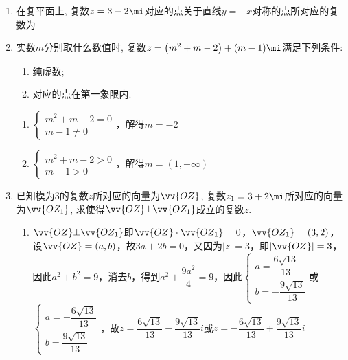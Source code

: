 \begin{enumerate}
    \item 在复平面上, 复数$z=3-2\mi$对应的点关于直线$y=-x$对称的点所对应的复数为
    \item 实数$m$分别取什么数值时, 复数$z=\left(m^2+m-2\right)+(m-1)\mi$满足下列条件: 
    \begin{enumerate}[(1)]
    \item 纯虚数; 
    \item 对应的点在第一象限内. 
    \end{enumerate}
    \begin{jieda}
        \begin{enumerate}
            \item $\left\{\begin{array}{l}
                 m^2+m-2 = 0 \\
                 m - 1 \neq 0
            \end{array}\right.$，解得$m = -2$
            \item $\left\{\begin{array}{l}
                 m^2+m-2 > 0 \\
                 m - 1 > 0
            \end{array}\right.$，解得$m = (1, +\infty)$
        \end{enumerate}
    \end{jieda}
    
    
    \item 已知模为3的复数$z$所对应的向量为$\vv{OZ}$, 复数$z_1=3+2\mi$所对应的向量为$\vv{OZ_1}$, 求使得$\vv{OZ}\bot\vv{OZ_1}$成立的复数$z$. 
    \begin{enumerate}
        \item $\vv{OZ}\bot\vv{OZ_1}$即$\vv{OZ}\cdot \vv{OZ_1} = 0$，$\vv{OZ_1} = (3, 2)$，设$\vv{OZ} = (a, b)$，故$3a+2b = 0$，又因为$|z| = 3$，即$|\vv{OZ}| = 3$，因此$a^2+b^2 = 9$，消去$b$，得到$a^2 + \dfrac{9a^2}{4} = 9$，因此$\left \{\begin{array}{l}
             a = \dfrac{6\sqrt{13}}{13} \\
             b = -\dfrac{9\sqrt{13}}{13}
        \end{array} \right.$或$\left \{\begin{array}{l}
             a = -\dfrac{6\sqrt{13}}{13} \\
             b = \dfrac{9\sqrt{13}}{13}
        \end{array} \right.$，故$z = \dfrac{6\sqrt{13}}{13} - \dfrac{9\sqrt{13}}{13}i$或$z = -\dfrac{6\sqrt{13}}{13} + \dfrac{9\sqrt{13}}{13}i$
    \end{enumerate}
    

\end{enumerate}
